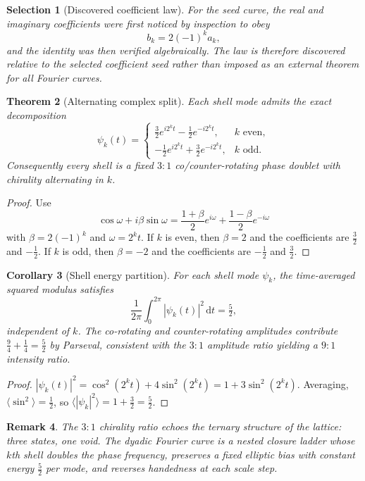 \documentclass[11pt]{article}
\theoremstyle{tight}
\newtheorem{theorem}{Theorem}[section]
\newtheorem{corollary}[theorem]{Corollary}
\theoremstyle{plainroman}
\newtheorem{selection}[theorem]{Selection}
\newtheorem{remark}[theorem]{Remark}
\newcommand{\dd}{\,\mathrm{d}}
\begin{document}
\begin{selection}[Discovered coefficient law]
For the seed curve, the real and imaginary coefficients were first noticed by inspection to obey
\[
b_k=2(-1)^k a_k,
\]
and the identity was then verified algebraically.
The law is therefore discovered relative to the selected coefficient seed rather than imposed as an external theorem for all Fourier curves.
\end{selection}
\begin{theorem}[Alternating complex split]
Each shell mode admits the exact decomposition
\[
\psi_k(t)=
\begin{cases}
\frac32 e^{i2^k t}-\frac12 e^{-i2^k t}, & k \text{ even},\\[4pt]
-\frac12 e^{i2^k t}+\frac32 e^{-i2^k t}, & k \text{ odd}.
\end{cases}
\]
Consequently every shell is a fixed $3{:}1$ co/counter-rotating phase doublet with chirality alternating in $k$.
\end{theorem}
\begin{proof}
Use
\[
\cos\omega + i\beta\sin\omega
=\frac{1+\beta}{2}e^{i\omega}+\frac{1-\beta}{2}e^{-i\omega}
\]
with $\beta=2(-1)^k$ and $\omega=2^k t$. If $k$ is even, then $\beta=2$ and the coefficients are $\frac32$ and $-\frac12$.
If $k$ is odd, then $\beta=-2$ and the coefficients are $-\frac12$ and $\frac32$.
\end{proof}
\begin{corollary}[Shell energy partition]\label{cor:energy}
For each shell mode $\psi_k$, the time-averaged squared modulus satisfies
\[
\frac{1}{2\pi}\int_0^{2\pi}|\psi_k(t)|^2\dd t = \tfrac{5}{2},
\]
independent of $k$.
The co-rotating and counter-rotating amplitudes contribute $\tfrac{9}{4}+\tfrac{1}{4}=\tfrac{5}{2}$ by Parseval, consistent with the $3{:}1$ amplitude ratio yielding a $9{:}1$ intensity ratio.
\end{corollary}
\begin{proof}
$|\psi_k(t)|^2=\cos^2(2^k t)+4\sin^2(2^k t)=1+3\sin^2(2^k t)$.
Averaging, $\langle\sin^2\rangle=\tfrac{1}{2}$, so $\langle|\psi_k|^2\rangle=1+\tfrac{3}{2}=\tfrac{5}{2}$.
\end{proof}
\begin{remark}
The $3{:}1$ chirality ratio echoes the ternary structure of the lattice: three states, one void.
The dyadic Fourier curve is a nested closure ladder whose $k$th shell doubles the phase frequency, preserves a fixed elliptic bias with constant energy $\tfrac{5}{2}$ per mode, and reverses handedness at each scale step.
\end{remark}
\end{document}
